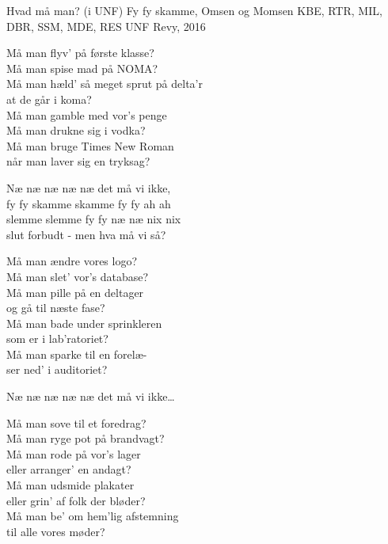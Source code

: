 \begin{song}{Hvad må man? (i UNF)}
  {} %
  {Fy fy skamme, Omsen og Momsen} %
  {KBE, RTR, MIL, DBR, SSM, MDE, RES} %
  {UNF Revy, 2016} %
  {\NotCCLIed} %

  \begin{SBVerse}
    Må man flyv’ på første klasse?\\
    Må man spise mad på NOMA?\\
    Må man hæld’ så meget sprut på delta’r\\
    at de går i koma?\\
    Må man gamble med vor’s penge \\
    Må man drukne sig i vodka?\\
    Må man bruge Times New Roman \\
    når man laver sig en tryksag?
  \end{SBVerse}

  \begin{SBChorus}
    Næ næ næ næ næ det må vi ikke,\\
    fy fy skamme skamme fy fy ah ah\\
    slemme slemme fy fy næ næ nix nix\\
    slut forbudt - men hva må vi så?
  \end{SBChorus}

  \begin{SBVerse}
    Må man ændre vores logo?\\
    Må man slet’ vor’s database?\\
    Må man pille på en deltager \\
    og gå til næste fase?\\
    Må man bade under sprinkleren\\
    som er i lab’ratoriet?\\
    Må man sparke til en forelæ-\\
    ser ned’ i auditoriet?
  \end{SBVerse}

  \begin{SBChorus}
    Næ næ næ næ næ det må vi ikke\ldots
  \end{SBChorus}

  \begin{SBVerse}
    Må man sove til et foredrag?\\
    Må man ryge pot på brandvagt?\\
    Må man rode på vor’s lager\\
    eller arranger’ en andagt?\\
    Må man udsmide plakater\\
    eller grin’ af folk der bløder?\\
    Må man be’ om hem’lig afstemning\\
    til alle vores møder?
  \end{SBVerse}


\end{song}
